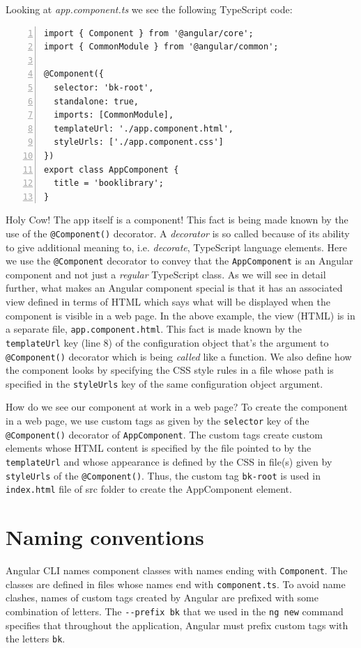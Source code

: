 \documentclass{report}
\begin{document}
Looking at \textsl{app.component.ts} we see the following TypeScript code:
\begin{Verbatim}[numbers=left]
import { Component } from '@angular/core';
import { CommonModule } from '@angular/common';

@Component({
  selector: 'bk-root',
  standalone: true,
  imports: [CommonModule],
  templateUrl: './app.component.html',
  styleUrls: ['./app.component.css']
})
export class AppComponent {
  title = 'booklibrary';
}
\end{Verbatim}

Holy Cow! The app itself is a component! This fact is being made known by the use of the \verb|@Component()| decorator. A \textsl{decorator} is so called because of its ability to give additional meaning to, i.e. \textsl{decorate}, TypeScript language elements. Here we use the \verb|@Component| decorator to convey that the \verb|AppComponent| is an Angular component and not just a \textsl{regular} TypeScript class. As we will see in detail further, what makes an Angular component special is that it has an associated view defined in terms of HTML which says what will be displayed when the component is visible in a web page. In the above example, the view (HTML) is in a separate file, \verb|app.component.html|. This fact is made known by the \verb|templateUrl| key (line 8) of the configuration object that's the argument to \verb|@Component()| decorator which is being \textsl{called} like a function. We also define how the component looks by specifying the CSS style rules in a file whose path is specified in the \verb|styleUrls| key of the same configuration object argument.

How do we see our component at work in a web page? To create the component in a web page, we use custom tags as given by the \verb|selector| key of the \verb|@Component()| decorator of \verb|AppComponent|. The custom tags create custom elements whose HTML content is specified by the file pointed to by the \verb|templateUrl| and whose appearance is defined by the CSS in file(s) given by \verb|styleUrls| of the \verb|@Component()|. Thus, the custom tag \verb|bk-root| is used in \verb|index.html| file of src folder to create the AppComponent element.

\section{Naming conventions}
Angular CLI names component classes with names ending with \texttt{Component}. The classes are defined in files whose names end with \verb|component.ts|. To avoid name clashes, names of custom tags created by Angular are prefixed with some combination of letters. The \verb|--prefix bk| that we used in the \verb|ng new| command specifies that throughout the application, Angular must prefix custom tags with the letters \verb|bk|.
\end{document}
